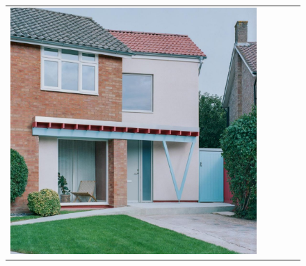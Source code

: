 \begin{figure}[H]
{\begin{tabular}{@{}ccccc@{}}
      \includegraphics[width=\linewidth]{Images/LoRAs/3D-effect/Training_images/10.jpg} \\[2pt]


\end{tabular}}
\end{figure}
